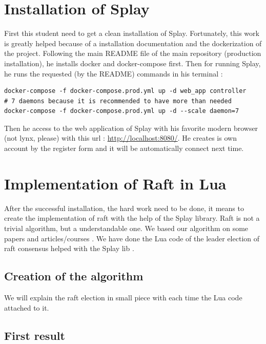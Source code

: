 \documentclass{eplmastersthesis}
\begin{document}
    \section{Installation of Splay}
      First this student need to get a clean installation of Splay. Fortunately, this work is greatly
      helped because of a installation documentation and the dockerization of the project.
      Following the main README file of the main repository (production installation), he installs docker and
      docker-compose first. Then for running Splay, he runs the requested (by the README) commands in his terminal :
      \begin{lstlisting}[style=MyBash]
docker-compose -f docker-compose.prod.yml up -d web_app controller
# 7 daemons because it is recommended to have more than needed
docker-compose -f docker-compose.prod.yml up -d --scale daemon=7
      \end{lstlisting}
      Then he access to the web application of Splay with his favorite modern browser (not lynx, please) with this url :
      \url{http://localhost:8080/}. He creates is own account by the register form and it will be automatically connect next time.

    \section{Implementation of Raft in Lua}
      After the successful installation, the hard work need to be done, it means to create the implementation of raft
      with the help of the Splay library. Raft is not a trivial algorithm, but a understandable one.
      We based our algorithm on some papers \cite{RaftPaper} and articles/courses \cite{RaftSlide} \cite{RaftSite}.
      We have done the Lua code of the leader election of raft consensus helped with the Splay lib \cite{SplayLib}. \\

      \subsection{Creation of the algorithm}
      We will explain the raft election in small piece with each time the Lua code attached to it.


      \subsection{First result}
\end{document}
